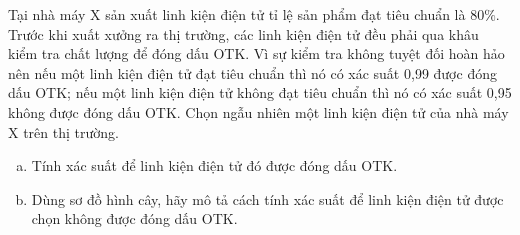 \begin{bt}%

	Tại nhà máy X sản xuất linh kiện điện tử tỉ lệ sản phẩm đạt tiêu chuẩn là $80 \%$. Trước khi xuất xưởng ra thị trường, các linh kiện điện tử đều phải qua khâu kiểm tra chất lượng để đóng dấu OTK. Vì sự kiểm tra không tuyệt đối hoàn hảo nên nếu một linh kiện điện tử đạt tiêu chuẩn thì nó có xác suất 0{,}99 được đóng dấu OTK; nếu một linh kiện điện tử không đạt tiêu chuẩn thì nó có xác suất 0{,}95 không được đóng dấu OTK. Chọn ngẫu nhiên một linh kiện điện tử của nhà máy X trên thị trường.
	\begin{enumerate}[a)]
		\item Tính xác suất để linh kiện điện tử đó được đóng dấu OTK.
		\item Dùng sơ đồ hình cây, hãy mô tả cách tính xác suất để linh kiện điện tử được chọn không được đóng dấu OTK.
	\end{enumerate}
	

\end{bt}
